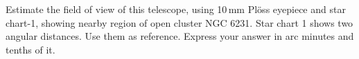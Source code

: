Estimate the field of view of this telescope, using 10\,mm Pl\"oss eyepiece
and star chart-1, showing nearby region of open cluster NGC 6231. Star chart
1 shows two angular distances. Use them as reference. Express your answer in
arc minutes and tenths of it.

